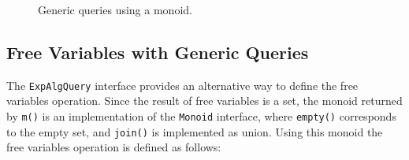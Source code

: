 \begin{figure}[tb]
\nocaptionrule
\caption{Generic queries using a monoid.}
\label{generic_query}
\end{figure}

\begin{comment}
And now we find everything goes in an easier way: we don't care about
what kind of query it is any more during the traversal. Despite
whether it asks for all the names of free variables or a printer
showing the hierarchy of an expression, at first we can simply
override the method \lstinline{m()}, which provides an instance of
\lstinline{Monoid}, in the return statement. As the next step, we only
need to override a few other methods to meet the requirements. This is
the progress, once we have such a template dealing with the traversal,
all query algebras can be addressed in a more concise way, which is
called the \textit{generic query algebra}.
\end{comment}

\subsection{Free Variables with Generic Queries}\label{subsec:solvingfreevars}


The \lstinline{ExpAlgQuery} interface provides an alternative way to
define the free variables operation.
Since the result of free variables is a set, the monoid returned by \lstinline{m()} is an implementation of the \lstinline{Monoid} interface, where \lstinline{empty()} corresponds to the empty set, and \lstinline{join()} is implemented as union.
Using this monoid
the free variables operation is defined as follows:



